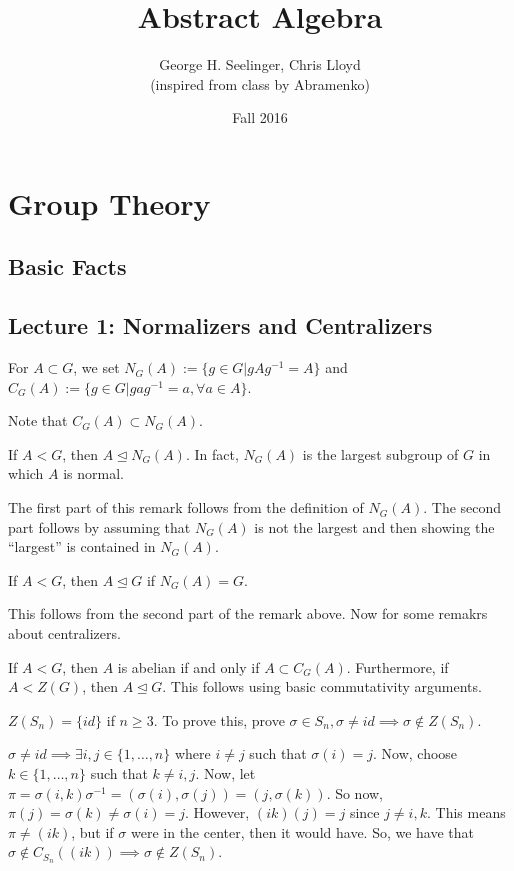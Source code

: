 \documentclass[11pt,leqno,oneside]{amsart}
\title[Abstract Algebra]{Abstract Algebra}
\author{George H. Seelinger, Chris Lloyd\\ (inspired from class by Abramenko)}
\date{Fall 2016}
\newcommand{\subgroup}{\mathrel{<}}
\newcommand{\normsubgroup}{\mathrel{\unlhd}}
\begin{document}
\maketitle
\section{Group Theory}
\subsection{Basic Facts}
\subsection*{Lecture 1: Normalizers and Centralizers}
\begin{defn}
    For $A \subset G$, we set $N_G(A) := \{g \in G | gAg^{-1} = A\}$ and
    $C_G(A) := \{g \in G | gag^{-1} = a, \forall a \in A\}$.
\end{defn}
Note that $C_G(A) \subset N_G(A)$.
\begin{rmk*}
    If $A \subgroup G$, then $A \normsubgroup N_G(A)$. In fact, $N_G(A)$ is the
    largest subgroup of $G$ in which $A$ is normal.
\end{rmk*}
    The first part of this remark follows from the definition of $N_G(A)$. The
    second part follows by assuming that $N_G(A)$ is not the largest and then
    showing the ``largest'' is contained in $N_G(A)$.
\begin{rmk*}
    If $A \subgroup G$, then $A \normsubgroup G$ if $N_G(A) = G$.
\end{rmk*}
    This follows from the second part of the remark above.
    Now for some remakrs about centralizers.
    \begin{rmk*}
        If $A \subgroup G$, then $A$ is abelian if and only if $A \subset
        C_G(A)$. Furthermore, if $A \subgroup Z(G)$, then $A \normsubgroup G$.
        This follows using basic commutativity arguments.
    \end{rmk*}
    \begin{example}
        $Z(S_n) = \{ id \}$ if $n \geq 3$. To prove this, prove $\sigma \in S_n, \sigma \neq id \implies \sigma \notin Z(S_n)$.

        $\sigma \neq id \implies \exists i,j \in \{1, \ldots, n\}$ where $i
        \neq j$ such that $\sigma(i) = j$. Now, choose $k \in \{1, \ldots, n\}$
        such that $k \neq i,j$. Now, let $\pi = \sigma(i,k)\sigma^{-1} =
        (\sigma(i), \sigma(j)) = (j, \sigma(k))$. So now, $\pi(j) = \sigma(k)
        \neq \sigma(i) = j$. However, $(ik)(j)=j$ since $j \neq i,k$. This
        means $\pi \neq (ik)$, but if $\sigma$ were in the center, then it
        would have. So, we have that $\sigma \notin C_{S_n}( (ik) ) \implies
        \sigma \notin Z(S_n)$.
    \end{example}
\end{document}
